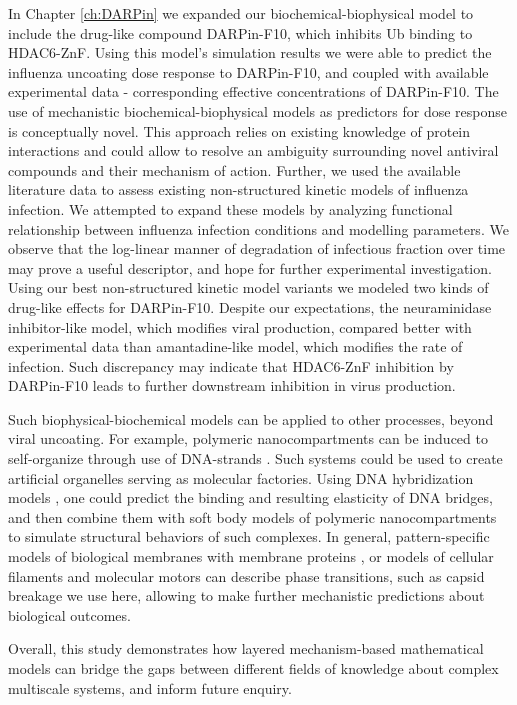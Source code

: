 In Chapter \ref{ch:DARPin} we expanded our biochemical-biophysical model to include the drug-like compound DARPin-F10, which inhibits Ub binding to HDAC6-ZnF. Using this model's simulation results we were able to predict the influenza uncoating dose response to DARPin-F10, and coupled with available experimental data - corresponding effective concentrations of DARPin-F10. The use of mechanistic biochemical-biophysical models as predictors for dose response is conceptually novel. This approach relies on existing knowledge of protein interactions and could allow to resolve an ambiguity surrounding novel antiviral compounds and their mechanism of action. Further, we used the available literature data \cite{rudiger2019multiscale, schulze2009infection} to assess existing non-structured kinetic models of influenza infection. We attempted to expand these models by analyzing functional relationship between influenza infection conditions and modelling parameters. We observe that the log-linear manner of degradation of infectious fraction over time may prove a useful descriptor, and hope for further experimental investigation. Using our best non-structured kinetic model variants we modeled two kinds of drug-like effects for DARPin-F10. Despite our expectations, the neuraminidase inhibitor-like model, which modifies viral production, compared better with experimental data than amantadine-like model, which modifies the rate of infection. Such discrepancy may indicate that HDAC6-ZnF inhibition by DARPin-F10 leads to further downstream inhibition in virus production.

Such biophysical-biochemical models can be applied to other processes, beyond viral uncoating. For example, polymeric nanocompartments can be induced to self-organize through use of DNA-strands \cite{liu2016dna}. Such systems could be used to create artificial organelles serving as molecular factories. Using DNA hybridization models \cite{karamasioti2019computational}, one could predict the binding and resulting elasticity of DNA bridges, and then combine them with soft body models of polymeric nanocompartments to simulate structural behaviors of such complexes. In general, pattern-specific models of biological membranes \cite{cheng2019biological} with membrane proteins \cite{ayton2009systematic}, or models of cellular filaments and molecular motors \cite{chen2019remote} can describe phase transitions, such as capsid breakage we use here, allowing to make further mechanistic predictions about biological outcomes. 

Overall, this study demonstrates how layered mechanism-based mathematical models can bridge the gaps between different fields of knowledge about complex multiscale systems, and inform future enquiry.